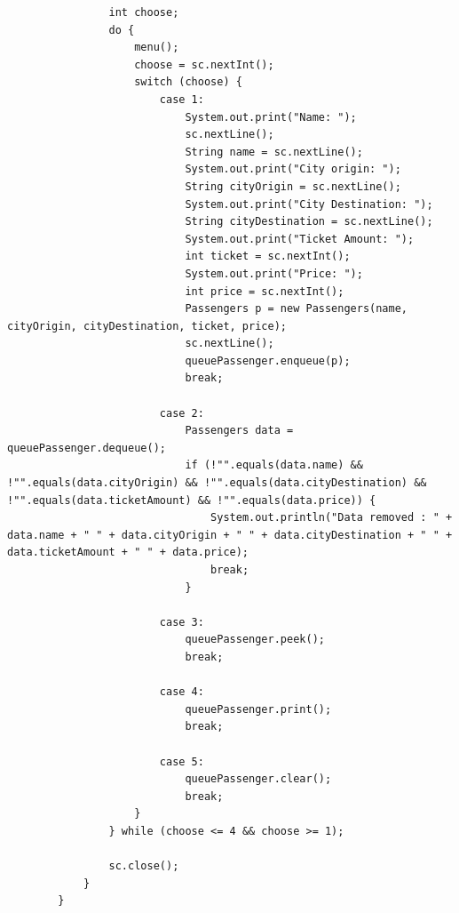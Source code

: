 \documentclass[12pt,titlepage]{article}
\begin{document}
\begin{enumerate}
\begin{verbatim}
                int choose;
                do {
                    menu();
                    choose = sc.nextInt();
                    switch (choose) {
                        case 1:
                            System.out.print("Name: ");
                            sc.nextLine();
                            String name = sc.nextLine();
                            System.out.print("City origin: ");
                            String cityOrigin = sc.nextLine();
                            System.out.print("City Destination: ");
                            String cityDestination = sc.nextLine();
                            System.out.print("Ticket Amount: ");
                            int ticket = sc.nextInt();
                            System.out.print("Price: ");
                            int price = sc.nextInt();
                            Passengers p = new Passengers(name, cityOrigin, cityDestination, ticket, price);
                            sc.nextLine();
                            queuePassenger.enqueue(p);
                            break;
                    
                        case 2:
                            Passengers data = queuePassenger.dequeue();
                            if (!"".equals(data.name) && !"".equals(data.cityOrigin) && !"".equals(data.cityDestination) && !"".equals(data.ticketAmount) && !"".equals(data.price)) {
                                System.out.println("Data removed : " + data.name + " " + data.cityOrigin + " " + data.cityDestination + " " + data.ticketAmount + " " + data.price);
                                break;
                            }
                        
                        case 3:
                            queuePassenger.peek();
                            break;
                        
                        case 4:
                            queuePassenger.print();
                            break;
                        
                        case 5:
                            queuePassenger.clear();
                            break;
                    }
                } while (choose <= 4 && choose >= 1);

                sc.close();
            }
        }
    \end{verbatim}
\end{enumerate}
\end{document}
